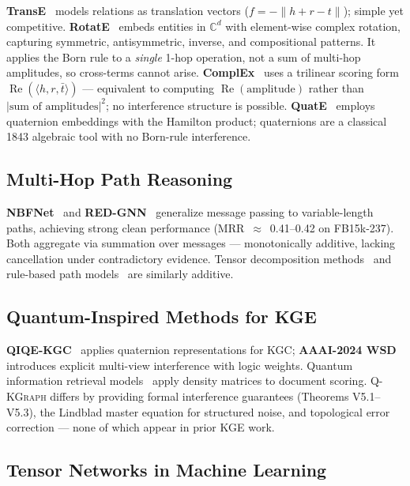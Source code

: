 \documentclass[runningheads]{llncs}
\newcommand{\QR}{\textsc{Q-KGraph}}
\newcommand{\CC}{\mathbb{C}}
\begin{document}
\textbf{TransE}~\cite{ref_transe} models relations as translation vectors
($f=-\|h+r-t\|$); simple yet competitive.  \textbf{RotatE}~\cite{ref_rotate}
embeds entities in $\CC^d$ with element-wise complex rotation, capturing
symmetric, antisymmetric, inverse, and compositional patterns.  It applies the
Born rule to a \emph{single} 1-hop operation, not a sum of multi-hop
amplitudes, so cross-terms cannot arise.  \textbf{ComplEx}~\cite{ref_complex}
uses a trilinear scoring form $\operatorname{Re}(\langle h,r,\bar{t}\rangle)$
--- equivalent to computing $\operatorname{Re}(\text{amplitude})$ rather than
$|\text{sum of amplitudes}|^2$; no interference structure is possible.
\textbf{QuatE}~\cite{ref_quate} employs quaternion embeddings with the
Hamilton product; quaternions are a classical 1843 algebraic tool with no
Born-rule interference.

\subsection{Multi-Hop Path Reasoning}

\textbf{NBFNet}~\cite{ref_nbfnet} and \textbf{RED-GNN}~\cite{ref_redgnn}
generalize message passing to variable-length paths, achieving strong clean
performance (MRR~$\approx$~0.41--0.42 on FB15k-237).  Both aggregate via
summation over messages --- monotonically additive, lacking cancellation under
contradictory evidence.  Tensor decomposition methods~\cite{ref_tucker} and
rule-based path models~\cite{ref_neurallp} are similarly additive.

\subsection{Quantum-Inspired Methods for KGE}

\textbf{QIQE-KGC}~\cite{ref_qiqe} applies quaternion representations for
KGC; \textbf{AAAI-2024 WSD}~\cite{ref_wsd} introduces explicit multi-view
interference with logic weights.  Quantum information retrieval
models~\cite{ref_qir} apply density matrices to document scoring.
\QR{} differs by providing formal interference guarantees (Theorems V5.1--V5.3),
the Lindblad master equation for structured noise, and topological error
correction --- none of which appear in prior KGE work.

\subsection{Tensor Networks in Machine Learning}
\end{document}
